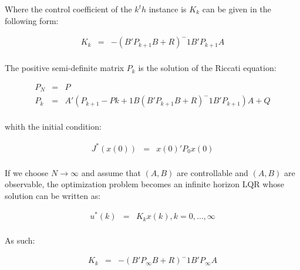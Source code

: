		Where the control coefficient of the $k^th$ instance is $K_k$ can be given in the following form:
		
		\begin{equation}
        \begin{array}{rcl}
         K_k&=&-(B'P_{k+1}B+R)^-1B'P_{k+1}A\\
        \end{array}
        \label{BASICMPC:equ:control_coefficient}
    \end{equation}
		
		The positive semi-definite matrix $P_k$ is the solution of the Riccati equation:
		
		\begin{equation}
        \begin{array}{rcl}
        P_N&=&P\\
				P_k&=&A'(P_{k+1}-P{k+1}B(B'P_{k+1}B+R)^-1B'P_{k+1})A+Q\\
        \end{array}
        \label{BASICMPC:equ:Riccati}
    \end{equation}
		
		whith the initial condition:
		
		\begin{equation}
        \begin{array}{rcl}
				J^*(x(0))&=&x(0)'P_0x(0)\\
        \end{array}
        \label{BASICMPC:equ:Riccati_initial}
    \end{equation}
		
		If we choose $N\longrightarrow\infty$ and assume that $(A,B)$ are controllable and $(A,B)$ are observable, the optimization problem becomes an infinite horizon LQR whose solution can be written as:
		
		\begin{equation}
        \begin{array}{rcl}
         u^*(k)&=&K_kx(k), k=0,\dots,\infty\\
        \end{array}
        \label{BASICMPC:equ:control_law_infinite}
    \end{equation}
		
		As such:
		
		\begin{equation}
        \begin{array}{rcl}
         K_k&=&-(B'P_\infty B+R)^-1B'P_\infty A\\
        \end{array}
        \label{BASICMPC:equ:control_coefficient_infinite}
    \end{equation}
		
